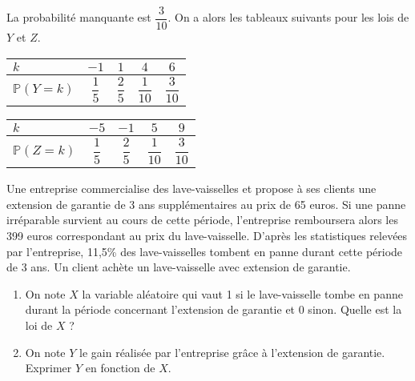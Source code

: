 \documentclass[11pt,fleqn, openany]{book} %
\begin{document}
\begin{solution}La probabilité manquante est $\dfrac{3}{10}$. On a alors les tableaux suivants pour les lois de $Y$ et $Z$.

\begin{minipage}{0.45\linewidth}
\renewcommand{\arraystretch}{2.2}
\begin{center}
\begin{tabular}{|l|c|c|c|c|}
\hline
$k$ & $-1$& $1$ & $4$ & $6$ \\
\hline
$\mathbb{P}(Y=k)$ & $\dfrac{1}{5}$ & $\dfrac{2}{5}$ & $\dfrac{1}{10}$   & $\dfrac{3}{10}$ \\
\hline \end{tabular}
\end{center}\end{minipage}\hfill \begin{minipage}{0.45\linewidth}
\renewcommand{\arraystretch}{2.2}
\begin{center}
\begin{tabular}{|l|c|c|c|c|}
\hline
$k$ & $-5$& $-1$ & $5$ & $9$ \\
\hline
$\mathbb{P}(Z=k)$ & $\dfrac{1}{5}$ & $\dfrac{2}{5}$ & $\dfrac{1}{10}$   & $\dfrac{3}{10}$ \\
\hline \end{tabular}
\end{center}\end{minipage}

\end{solution}



\begin{exercise}[topic=lgn01]Une entreprise commercialise des lave-vaisselles et propose à ses clients une extension de garantie de 3 ans supplémentaires au prix de 65 euros. Si une panne irréparable survient au cours de cette période, l'entreprise remboursera alors les 399 euros correspondant au prix du lave-vaisselle. D'après les statistiques relevées par l'entreprise, 11,5\% des lave-vaisselles tombent en panne durant cette période de 3 ans. Un client achète un lave-vaisselle avec extension de garantie.
\begin{enumerate}
\item On note $X$ la variable aléatoire qui vaut 1 si le lave-vaisselle tombe en panne durant la période concernant l'extension de garantie et 0 sinon. Quelle est la loi de $X$ ?
\item On note $Y$ le gain réalisée par l'entreprise grâce à l'extension de garantie. Exprimer $Y$ en fonction de $X$.
\end{enumerate}\end{exercise}
\end{document}
